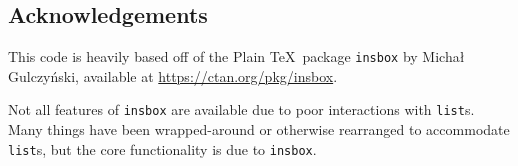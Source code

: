 \documentclass{article}
\begin{document}
	\subsection*{Acknowledgements}
	
	This code is heavily based off of the Plain \TeX\ package \verb|insbox| by Micha\l{} Gulczy\'nski, available at \url{https://ctan.org/pkg/insbox}.
	
	Not all features of \verb|insbox| are available due to poor interactions with \verb|list|s.
	Many things have been wrapped-around or otherwise rearranged to accommodate \verb|list|s, but the core functionality is due to \verb|insbox|.
	
\end{document}
